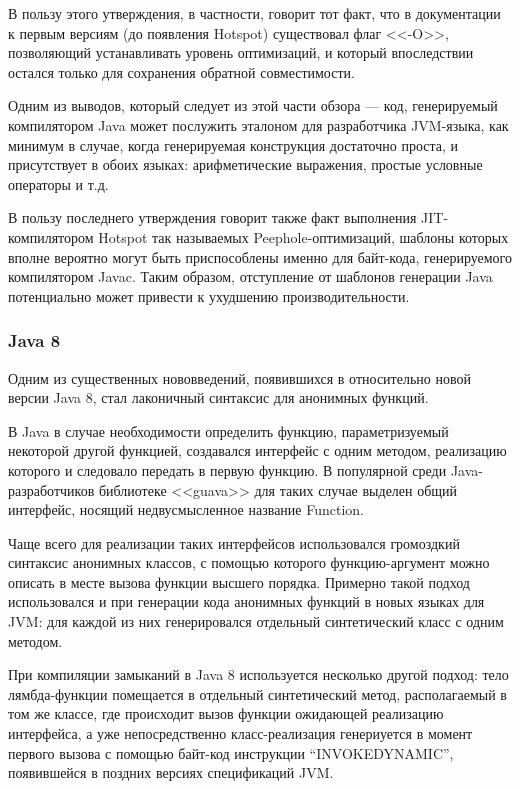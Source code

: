 В пользу этого утверждения, в частности, говорит тот факт, что в документации к первым версиям
(до появления Hotspot) существовал флаг
<<-O>>,
позволяющий устанавливать уровень оптимизаций, и который впоследствии остался только для
сохранения обратной совместимости.

Одним из выводов, который следует из этой части обзора --- код, генерируемый компилятором Java
может послужить эталоном для разработчика JVM-языка, как минимум в случае, когда
генерируемая конструкция достаточно проста, и присутствует в обоих языках: арифметические выражения,
простые условные операторы и т.д.

В пользу последнего утверждения говорит также факт выполнения JIT-компилятором Hotspot
так называемых Peephole-оптимизаций\cite{HotSpotDesign}, шаблоны которых вполне вероятно могут быть
приспособлены именно для байт-кода, генерируемого компилятором Javac.
Таким образом, отступление от шаблонов генерации Java потенциально может привести к ухудшению
производительности.

\subsubsection{Java 8}
Одним из существенных нововведений, появившихся в относительно новой версии Java 8, стал лаконичный
синтаксис для анонимных функций.

В Java в случае необходимости определить функцию, параметризуемый некоторой другой
функцией, создавался интерфейс с одним методом, реализацию которого и следовало передать в первую
функцию.
В популярной среди Java-разработчиков библиотеке <<guava>> для таких случае выделен общий
интерфейс, носящий недвусмысленное название Function.

Чаще всего для реализации таких интерфейсов использовался громоздкий синтаксис анонимных классов,
с помощью которого функцию-аргумент можно описать в месте вызова функции высшего порядка.
Примерно такой подход использовался и при генерации кода анонимных функций в новых языках для JVM:
для каждой из них генерировался отдельный синтетический класс с одним методом.

При компиляции замыканий в Java 8 используется несколько другой подход\cite{J8LambdaTranslation}:
тело лямбда-функции помещается в отдельный синтетический метод, располагаемый в том же классе,
где происходит вызов функции ожидающей реализацию интерфейса, а уже непосредственно класс-реализация
генериуется в момент первого вызова с помощью байт-код инструкции ``INVOKEDYNAMIC'',
появившейся в поздних версиях спецификаций JVM.

